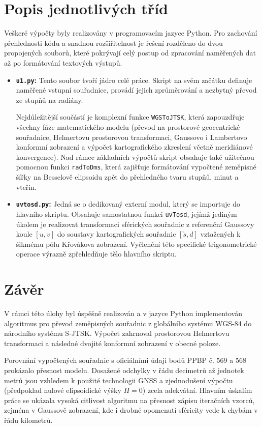 \documentclass[12pt, a4paper]{article}
\begin{document}
\section{Popis jednotlivých tříd}
Veškeré výpočty byly realizovány v programovacím jazyce Python. Pro zachování přehlednosti kódu a snadnou rozšiřitelnost je řešení rozděleno do dvou propojených souborů, které pokrývají celý postup od zpracování naměřených dat až po formátování textových výstupů.

\begin{itemize}
    \item \textbf{\texttt{u1.py}:} Tento soubor tvoří jádro celé práce. Skript na svém začátku definuje naměřené vstupní souřadnice, provádí jejich zprůměrování a nezbytný převod ze stupňů na radiány. 
    
    Nejdůležitější součástí je komplexní funkce \texttt{WGSToJTSK}, která zapouzdřuje všechny fáze matematického modelu (převod na prostorové geocentrické souřadnice, Helmertovu prostorovou transformaci, Gaussovo i Lambertovo konformní zobrazení a výpočet kartografického zkreslení včetně meridiánové konvergence). Nad rámec základních výpočtů skript obsahuje také užitečnou pomocnou funkci \texttt{radToDms}, která zajišťuje formátování vypočtené zeměpisné šířky na Besselově elipsoidu zpět do přehledného tvaru stupňů, minut a vteřin.
    
    \item \textbf{\texttt{uvtosd.py}:} Jedná se o dedikovaný externí modul, který se importuje do hlavního skriptu. Obsahuje samostatnou funkci \texttt{uvTosd}, jejímž jediným úkolem je realizovat transformaci sférických souřadnic z referenční Gaussovy koule $[u, v]$ do soustavy kartografických souřadnic $[\check{s}, d]$ vztažených k šikmému pólu Křovákova zobrazení. Vyčlenění této specifické trigonometrické operace výrazně zpřehledňuje tělo hlavního skriptu.

\end{itemize}

\section*{Závěr}
V rámci této úlohy byl úspěšně realizován a v jazyce Python implementován algoritmus pro převod zeměpisných souřadnic z globálního systému WGS-84 do národního systému S-JTSK. Výpočet zahrnoval prostorovou Helmertovu transformaci a následné dvojité konformní zobrazení v obecné poloze.

Porovnání vypočtených souřadnic s oficiálními údaji bodů PPBP č. 569 a 568 prokázalo přesnost modelu. Dosažené odchylky v řádu decimetrů až jednotek metrů jsou vzhledem k použité technologii GNSS a zjednodušení výpočtu (předpoklad nulové elipsoidické výšky $H=0$) zcela adekvátní. Hlavním úskalím práce se ukázala vysoká citlivost algoritmu na přesnost zápisu iteračních vzorců, zejména v Gaussově zobrazení, kde i drobné opomenutí sféricity vede k chybám v řádu kilometrů.
\end{document}
